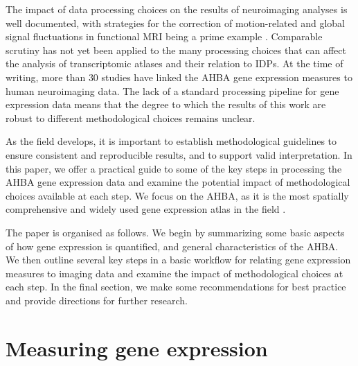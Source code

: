 \documentclass[10pt,A4]{article}
\begin{document}
The impact of data processing choices on the results of neuroimaging analyses is well documented, with strategies for the correction of motion-related and global signal fluctuations in functional MRI being a prime example \citep{Power2015a,Power2017,Ciric2017,Parkes2018}. Comparable scrutiny has not yet been applied to the many processing choices that can affect the analysis of transcriptomic atlases and their relation to IDPs. At the time of writing, more than $30$ studies have linked the AHBA gene expression measures to human neuroimaging data. The lack of a standard processing pipeline for gene expression data means that the degree to which the results of this work are robust to different methodological choices remains unclear.

As the field develops, it is important to establish methodological guidelines to ensure consistent and reproducible results, and to support valid interpretation. In this paper, we offer a practical guide to some of the key steps in processing the AHBA gene expression data and examine the potential impact of methodological choices available at each step. We focus on the AHBA, as it is the most spatially comprehensive and widely used gene expression atlas in the field \citep{Hawrylycz2012}.

The paper is organised as follows. We begin by summarizing some basic aspects of how gene expression is quantified, and general characteristics of the AHBA. We then outline several key steps in a basic workflow for relating gene expression measures to imaging data and examine the impact of methodological choices at each step. In the final section, we make some recommendations for best practice and provide directions for further research.

\section*{Measuring gene expression}
\end{document}
